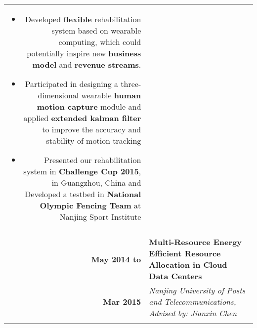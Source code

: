 \documentclass[a4paper, 10pt]{extarticle} %
\begin{document}
\begin{CJK*}{GBK}{song}
\begin{longtable}{r | p{15cm}}
{\begin{itemize}[leftmargin=*]
\item Developed \textbf{flexible} rehabilitation system based on wearable computing, which could potentially inspire new \textbf{business model} and \textbf{revenue streams}.

\item Participated in designing a three-dimensional wearable \textbf{human motion capture} module and applied \textbf{extended kalman filter} to improve the accuracy and stability of motion tracking

\item Presented our rehabilitation system in \textbf{Challenge Cup 2015}, in Guangzhou, China and Developed a testbed in \textbf{National Olympic Fencing Team} at Nanjing Sport Institute

\vspace{-0.4cm}

\end{itemize}
}
\\


\multicolumn{2}{c}{} \\

			\textbf{May 2014 to}
		
		 &
		
		 \textbf{Multi-Resource Energy Efficient Resource Allocation in Cloud Data Centers}  \\
		
			\textbf{Mar 2015}
		
		& \footnotesize{

\vspace{-0.3cm}\textit{Nanjing University of Posts and Telecommunications, Advised by: Jianxin Chen}}
\\
		
&

\footnotesize{

\vspace{-0.3cm}

\begin{itemize}[leftmargin=*]


\end{itemize}}
\end{longtable}
\end{CJK*}
\end{document}
